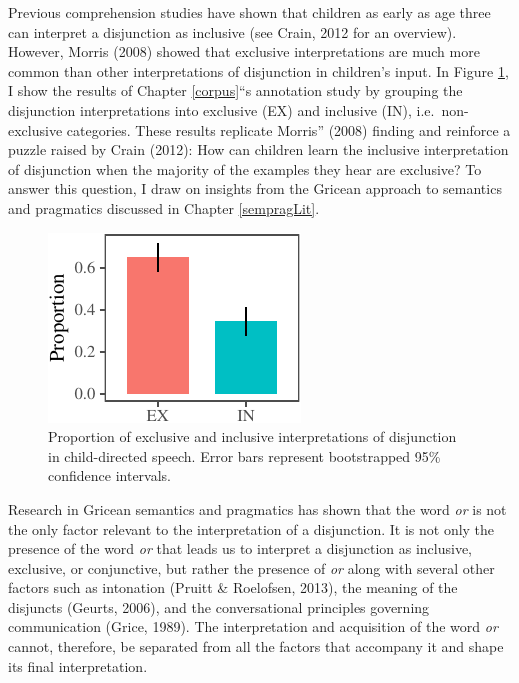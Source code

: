 \documentclass[floatsintext,man]{apa6}
\theoremstyle{definition}
\theoremstyle{definition}
\theoremstyle{definition}
\theoremstyle{remark}
\begin{document}
Previous comprehension studies have shown that children as early as age
three can interpret a disjunction as inclusive (see Crain, 2012 for an
overview). However, Morris (2008) showed that exclusive interpretations
are much more common than other interpretations of disjunction in
children's input. In Figure \ref{fig:interpretation}, I show the results
of Chapter \ref{corpus}\enquote{s annotation study by grouping the
disjunction interpretations into exclusive (EX) and inclusive (IN),
i.e.~non-exclusive categories. These results replicate Morris} (2008)
finding and reinforce a puzzle raised by Crain (2012): How can children
learn the inclusive interpretation of disjunction when the majority of
the examples they hear are exclusive? To answer this question, I draw on
insights from the Gricean approach to semantics and pragmatics discussed
in Chapter \ref{sempragLit}.

\begin{figure}[tb]

{\centering \includegraphics{figs/interpretation-1} 

}

\caption{Proportion of exclusive and inclusive interpretations of disjunction in child-directed speech. Error bars represent bootstrapped 95\% confidence intervals.}\label{fig:interpretation}
\end{figure}

Research in Gricean semantics and pragmatics has shown that the word
\emph{or} is not the only factor relevant to the interpretation of a
disjunction. It is not only the presence of the word \emph{or} that
leads us to interpret a disjunction as inclusive, exclusive, or
conjunctive, but rather the presence of \emph{or} along with several
other factors such as intonation (Pruitt \& Roelofsen, 2013), the
meaning of the disjuncts (Geurts, 2006), and the conversational
principles governing communication (Grice, 1989). The interpretation and
acquisition of the word \emph{or} cannot, therefore, be separated from
all the factors that accompany it and shape its final interpretation.
\end{document}
